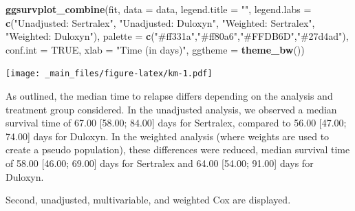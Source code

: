 \documentclass[
]{book}
\newenvironment{Shaded}{\begin{snugshade}}{\end{snugshade}}
\newcommand{\AttributeTok}[1]{\textcolor[rgb]{0.13,0.29,0.53}{#1}}
\newcommand{\ConstantTok}[1]{\textcolor[rgb]{0.56,0.35,0.01}{#1}}
\newcommand{\FunctionTok}[1]{\textcolor[rgb]{0.13,0.29,0.53}{\textbf{#1}}}
\newcommand{\NormalTok}[1]{#1}
\newcommand{\StringTok}[1]{\textcolor[rgb]{0.31,0.60,0.02}{#1}}
\begin{document}
\begin{Shaded}
\begin{Highlighting}[]
\FunctionTok{ggsurvplot\_combine}\NormalTok{(fit, }
                   \AttributeTok{data =}\NormalTok{ data,}
                   \AttributeTok{legend.title =} \StringTok{""}\NormalTok{,}
                   \AttributeTok{legend.labs =} \FunctionTok{c}\NormalTok{(}\StringTok{"Unadjusted: Sertralex"}\NormalTok{, }
                                   \StringTok{"Unadjusted: Duloxyn"}\NormalTok{,}
                                   \StringTok{"Weighted: Sertralex"}\NormalTok{, }
                                   \StringTok{"Weighted: Duloxyn"}\NormalTok{),}
                   \AttributeTok{palette =} \FunctionTok{c}\NormalTok{(}\StringTok{"\#ff331a"}\NormalTok{,}\StringTok{"\#ff80a6"}\NormalTok{,}\StringTok{"\#FFDB6D"}\NormalTok{,}\StringTok{"\#27d4ad"}\NormalTok{),}
                   \AttributeTok{conf.int =} \ConstantTok{TRUE}\NormalTok{,}
                   \AttributeTok{xlab =} \StringTok{"Time (in days)"}\NormalTok{,}
                   \AttributeTok{ggtheme =} \FunctionTok{theme\_bw}\NormalTok{())}
\end{Highlighting}
\end{Shaded}

\texttt{[image: \_main\_files/figure-latex/km-1.pdf]}

As outlined, the median time to relapse differs depending on the
analysis and treatment group considered. In the unadjusted analysis, we
observed a median survival time of 67.00 {[}58.00; 84.00{]} days for
Sertralex, compared to 56.00 {[}47.00; 74.00{]} days for Duloxyn. In the
weighted analysis (where weights are used to create a pseudo
population), these differences were reduced, median survival time of
58.00 {[}46.00; 69.00{]} days for Sertralex and 64.00 {[}54.00; 91.00{]}
days for Duloxyn.

Second, unadjusted, multivariable, and weighted Cox are displayed.
\end{document}
